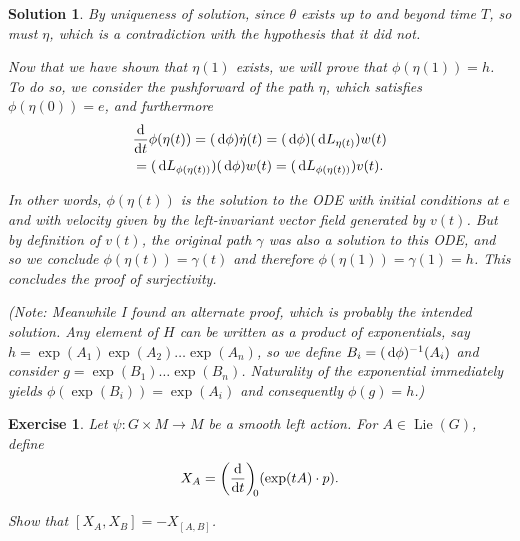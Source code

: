 \documentclass{article}
\newtheorem{ex}{Exercise}
\theoremstyle{nonumberplain}
\newtheorem{sol}{Solution}
\DeclareMathOperator{\Lie}{Lie}
\begin{document}
\begin{sol}
By uniqueness of solution, since $\theta$ exists up to and beyond time $T$, so must $\eta$, which is a contradiction with the hypothesis that it did not.


Now that we have shown that $\eta(1)$ exists, we will prove that $\phi(\eta(1)) = h$. To do so, we consider the pushforward of the path $\eta$, which satisfies $\phi(\eta(0)) = e$, and furthermore
\begin{multline*}
\diff{}t \phi(\eta(t)) = (\dl \phi) \dot\eta(t) = (\dl \phi)(\dl L_{\eta(t)}) w(t)\\
= (\dl L_{\phi(\eta(t))}) (\dl \phi) w(t) = (\dl L_{\phi(\eta(t))}) v(t).
\end{multline*}

In other words, $\phi(\eta(t))$ is the solution to the ODE with initial conditions at $e$ and with velocity given by the left-invariant vector field generated by $v(t)$. But by definition of $v(t)$, the original path $\gamma$ was also a solution to this ODE, and so we conclude $\phi(\eta(t)) = \gamma(t)$ and therefore $\phi(\eta(1)) = \gamma(1) = h$. This concludes the proof of surjectivity.

\smallskip

(Note: Meanwhile I found an alternate proof, which is probably the intended solution. Any element of $H$ can be written as a product of exponentials, say $h = \exp(A_1) \exp(A_2) \dots \exp(A_n)$, so we define $B_i = (\dl \phi)^{-1}(A_i)$ and consider $g = \exp(B_1) \dots \exp(B_n)$. Naturality of the exponential immediately yields $\phi(\exp(B_i)) = \exp(A_i)$ and consequently $\phi(g) = h$.)
\end{sol}

\begin{ex}
Let $\psi \colon G \times M \to M$ be a smooth left action. For $A \in \Lie(G)$, define
\[X_A = \diff{}t[0] (\exp(tA) \cdot p).\]

Show that $[X_A, X_B] = - X_{[A,B]}$.
\end{ex}
\end{document}
